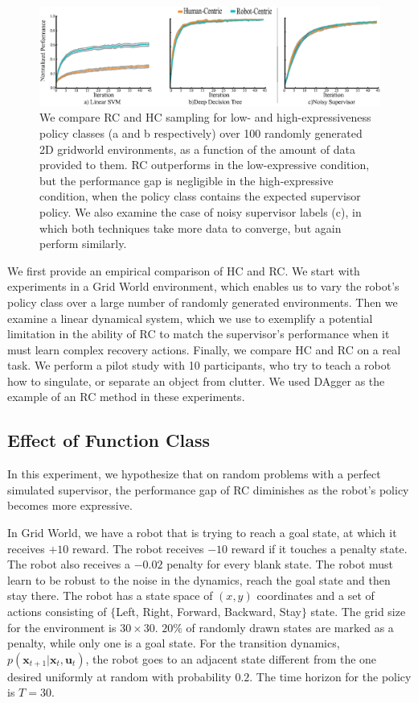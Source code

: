 \documentclass[10pt, conference]{ieeeconf}      %
\newcommand{\bu}{\mathbf{u}}
\newcommand{\bx}{\mathbf{x}}
\begin{document}
\begin{figure}
\includegraphics{f_figs/var_grid.eps}
\caption{
    \footnotesize
We compare RC and HC sampling for low- and high-expressiveness policy classes (a and b respectively) over 100 randomly generated 2D gridworld environments, as a function of the amount of data provided to them. RC outperforms in the low-expressive condition, but the performance gap is negligible in the high-expressive condition, when the policy class contains the expected supervisor policy. We also examine the case of noisy supervisor labels (c), in which both techniques take more data to converge, but again perform similarly. 
}
\vspace*{-20pt}
\label{fig:var}
\end{figure}

We first provide an empirical comparison of HC and RC. 
We start with experiments in a Grid World environment, which enables us to vary the robot's policy class over a large number of randomly generated environments. Then we examine a linear dynamical system, which we use to exemplify a potential limitation in the ability of RC to match the supervisor's performance when it must learn complex recovery actions.
Finally, we compare HC and RC on a real task. We perform a pilot study with 10 participants, who try to teach a robot how to singulate, or separate an object from clutter. We used DAgger as the example of an RC method in these experiments. 

\subsection{Effect of Function Class}\label{sec:gdw}
In this experiment, we hypothesize that on random problems with a perfect simulated supervisor, the performance gap of RC diminishes as the robot's policy becomes more expressive. 

In Grid World, we have a robot that is trying to reach a goal state, at which it receives $+10$ reward. The robot receives $-10$ reward if it touches a penalty state. The robot also receives a $-0.02$ penalty for every blank state. The robot must learn to be robust to the noise in the dynamics, reach the goal state and then stay there.
The robot has a state space of $(x,y)$ coordinates and a set of actions consisting of $\lbrace$Left, Right, Forward, Backward, Stay$\rbrace$ state. The grid size for the environment is $30 \times 30$. $20\%$ of randomly drawn states are marked as a penalty, while only one is a goal state. For the transition dynamics, $p(\bx_{t+1}|\bx_{t},\bu_t)$, the robot goes to an adjacent state different from the one desired uniformly at random with probability $0.2$. The time horizon for the policy is $T=30$. 
\end{document}
